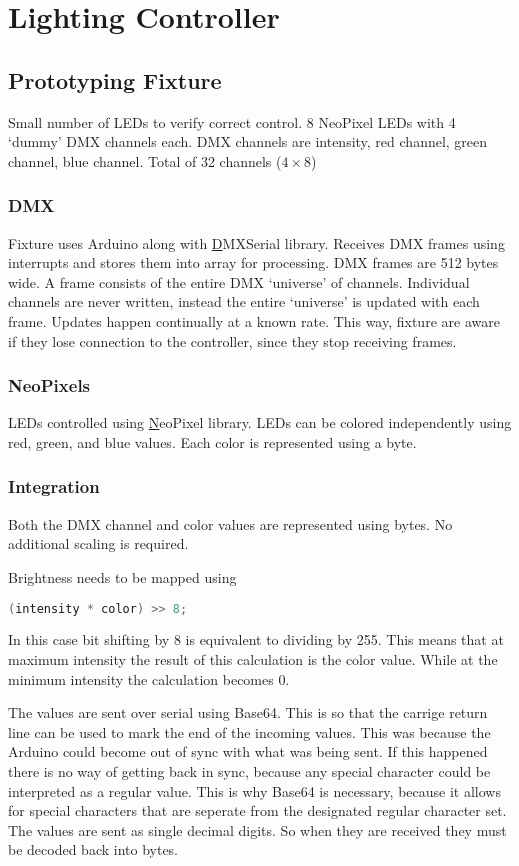 \chapter{Lighting Controller}
\section{Prototyping Fixture}
Small number of LEDs to verify correct control.
8 NeoPixel LEDs with 4 `dummy' DMX channels each.
DMX channels are intensity, red channel, green channel, blue channel.
Total of 32 channels (\(4 \times 8\))

\subsection{DMX}
Fixture uses Arduino along with
\href{https://github.com/mathertel/DMXSerial}DMXSerial library.
Receives DMX frames using interrupts
and stores them into array for processing.
DMX frames are 512 bytes wide.
A frame consists of the entire DMX `universe' of channels.
Individual channels are never written,
instead the entire `universe' is updated with each frame.
Updates happen continually at a known rate.
This way, fixture are aware if they lose connection to the controller,
since they stop receiving frames.

\subsection{NeoPixels}
LEDs controlled using \href{https://github.com/adafruit/Adafruit_NeoPixel}NeoPixel library.
LEDs can be colored independently using red, green, and blue values.
Each color is represented using a byte.

\subsection{Integration}
Both the DMX channel and color values are represented using bytes.
No additional scaling is required.

Brightness needs to be mapped using
\begin{lstlisting}[language=C]
  (intensity * color) >> 8;
\end{lstlisting}

In this case bit shifting by 8 is equivalent to dividing by 255.
This means that at maximum intensity the result of this calculation is the color value.
While at the minimum intensity the calculation becomes 0.

The values are sent over serial using Base64.
This is so that the carrige return line can be used to mark the end of the incoming values.
This was because the Arduino could become out of sync with what was being sent.
If this happened there is no way of getting back in sync,
because any special character could be interpreted as a regular value.
This is why Base64 is necessary, because it allows for special characters that are seperate
from the designated regular character set.
The values are sent as single decimal digits.
So when they are received they must be decoded back into bytes.

